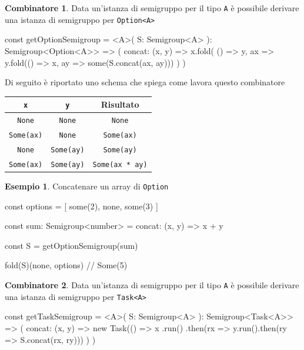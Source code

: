 \documentclass[12pt]{article}
\theoremstyle{definition}
\newtheorem{example}{Esempio}[section]
\newtheorem{combinator}{Combinatore}[section]
\newenvironment{code}
  {\vspace{0.5cm} \VerbatimEnvironment\begin{typescriptcode}}
  {\end{typescriptcode} \vspace{0.2cm}}
\begin{document}
\begin{combinator}
Data un'istanza di semigruppo per il tipo \texttt{A} è possibile derivare una istanza di semigruppo per \texttt{Option<A>}

\begin{code}
const getOptionSemigroup = <A>(
  S: Semigroup<A>
): Semigroup<Option<A>> => ({
  concat: (x, y) =>
    x.fold(
      () => y,
      ax => y.fold(() => x, ay => some(S.concat(ax, ay)))
    )
})
\end{code}

Di seguito è riportato uno schema che spiega come lavora questo combinatore

\begin{center}
\bgroup
\def\arraystretch{1.5}
\begin{tabular}{ |c|c|c| }
\hline
\texttt{x} & \texttt{y} & Risultato \\
\hline
\texttt{None} & \texttt{None} & \texttt{None} \\
\hline
\texttt{Some(ax)} & \texttt{None} & \texttt{Some(ax)} \\
\hline
\texttt{None} & \texttt{Some(ay)} & \texttt{Some(ay)} \\
\hline
\texttt{Some(ax)} & \texttt{Some(ay)} & \texttt{Some(ax * ay)} \\
\hline
\end{tabular}
\egroup
\end{center}
\end{combinator}

\begin{example}
Concatenare un array di \texttt{Option}

\begin{code}
const options = [
  some(2),
  none,
  some(3)
]

const sum: Semigroup<number> = {
  concat: (x, y) => x + y
}

const S = getOptionSemigroup(sum)

fold(S)(none, options) // Some(5)
\end{code}
\end{example}

\begin{combinator}
Data un'istanza di semigruppo per il tipo \texttt{A} è possibile derivare una istanza di semigruppo per \texttt{Task<A>}

\begin{code}
const getTaskSemigroup = <A>(
  S: Semigroup<A>
): Semigroup<Task<A>> => ({
  concat: (x, y) =>
    new Task(() =>
      x
        .run()
        .then(rx => y.run().then(ry => S.concat(rx, ry)))
    )
})
\end{code}
\end{combinator}
\end{document}
